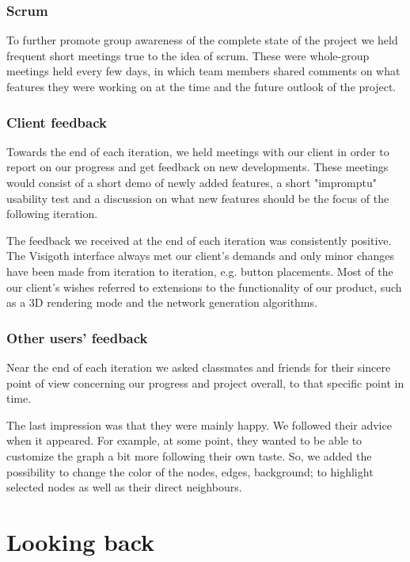 \documentclass[a4paper,11pt,titlepage]{article}
\let\stdsection\section         %
\renewcommand{\section}{\newpage\stdsection}
\begin{document}
\subsubsection{Scrum}
To further promote group awareness of the complete state of the
project we held frequent short meetings true to the idea of scrum.
These were whole-group meetings held every few days, in which team
members shared comments on what features they were working on at
the time and the future outlook of the project.

\subsubsection{Client feedback}
Towards the end of each iteration, we held meetings with our client
in order to report on our progress and get feedback on new
developments. These meetings would consist of a short demo of newly
added features, a short "impromptu" usability test and a discussion
on what new features should be the focus of the following iteration.

The feedback we received at the end of each iteration was
consistently positive. The Visigoth interface always met our
client's demands and only minor changes have been made from
iteration to iteration, e.g. button placements. Most of the our
client's wishes referred to extensions to the functionality of
our product, such as a 3D rendering mode and the network generation
algorithms.


\subsubsection{Other users' feedback}
Near the end of each iteration we asked classmates and friends for
their sincere point of view concerning our progress and project
overall, to that specific point in time.

The last impression was that they were mainly happy. We followed their
advice when it appeared. For example, at some point, they wanted to be
able to customize the graph a bit more following their own taste. So,
we added the possibility to change the color of the nodes, edges,
background; to highlight selected nodes as well as their direct
neighbours.



\section{Looking back}
\end{document}
